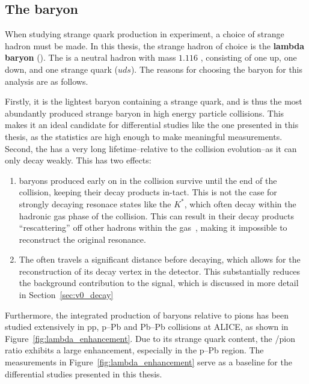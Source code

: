 \subsection{The \lmb baryon}
\label{sec:lambda_baryon}

When studying strange quark production in experiment, a choice of strange hadron must be made. In this thesis, the strange hadron of choice is the \textbf{lambda baryon} (\lmb). The \lmb is a neutral hadron with mass $1.116$ \GeVmass, consisting of one up, one down, and one strange quark ($uds$). The reasons for choosing the \lmb baryon for this analysis are as follows.

Firstly, it is the lightest baryon containing a strange quark, and is thus the most abundantly produced strange baryon in high energy particle collisions. This makes it an ideal candidate for differential studies like the one presented in this thesis, as the statistics are high enough to make meaningful measurements. Second, the \lmb has a very long lifetime--relative to the collision evolution--as it can only decay weakly. This has two effects:
\begin{enumerate}
    \item \lmb baryons produced early on in the collision survive until the end of the collision, keeping their decay products in-tact. This is not the case for strongly decaying resonace states like the $K^*$, which often decay within the hadronic gas phase of the collision. This can result in their decay products ``rescattering'' off other hadrons within the gas~\cite{Rescatter}, making it impossible to reconstruct the original resonance.
    \item The \lmb often travels a significant distance before decaying, which allows for the reconstruction of its decay vertex in the detector. This substantially reduces the background contribution to the \lmb signal, which is discussed in more detail in Section~\ref{sec:v0_decay}
\end{enumerate}
Furthermore, the integrated production of \lmb baryons relative to pions has been studied extensively in pp, p--Pb and Pb--Pb collisions at ALICE, as shown in Figure~\ref{fig:lambda_enhancement}. Due to its strange quark content, the \lmb/pion ratio exhibits a large enhancement, especially in the p--Pb region. The measurements in Figure~\ref{fig:lambda_enhancement} serve as a baseline for the differential studies presented in this thesis.

